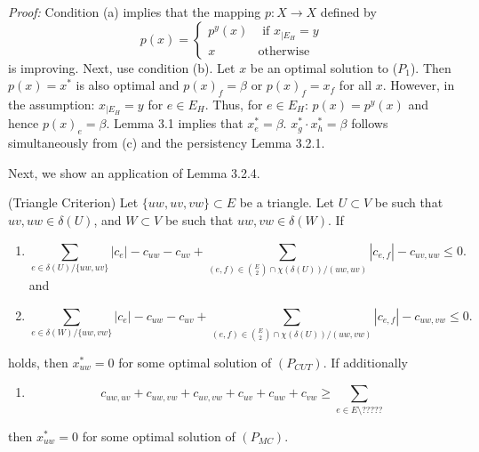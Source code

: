 \textit{Proof:} Condition (a) implies that the mapping $p:X \to X$ defined by 
\[ p(x)= \begin{cases}
    p^y(x) & \text{ if } x_{|E_H} =y \\
    x & \text{otherwise } 
\end{cases} \]
is improving. 
Next, use condition (b). Let $x$ be an optimal solution to ($P_1$). Then $p(x)=x^*$ is also optimal and $p(x)_f= \beta$ or $p(x)_f=x_f$ for all $x$. However, in the assumption: $x_{|E_H} = y$ for $e \in E_H$. Thus, for $e \in E_H$: $p(x)=p^y(x)$ and hence $p(x)_e=\beta$. Lemma 3.1 implies that $x^*_e=\beta$.
$x^*_g \cdot x^*_h = \beta$ follows simultaneously from (c) and the persistency Lemma 3.2.1.  

Next, we show an application of Lemma 3.2.4.
\begin{corollary}{(Triangle Criterion)}
Let $\{uw,uv,vw\} \subset E$ be a triangle. Let $U \subset V$ be such that $uv, uw \in \delta(U)$, and $W \subset V$ be such that $uw,vw \in \delta(W)$. If 
\begin{enumerate}
\item \begin{equation*}
\sum_{e \in \delta(U)/ \{uw, uv \}} |c_e| - c_{uw} -c_{uv} + \sum_{ (e,f) \in {E \choose 2} \cap \chi(\delta(U))  / (uw, uv)} |c_{e,f}|-c_{uv,uw} \leq 0. 
\end{equation*} and
\item \begin{equation*}
\sum_{e \in \delta(W)/ \{uw, vw \}} |c_e| - c_{uw} -c_{uv} + \sum_{ (e,f) \in {\binom{E}{2}} \cap \chi(\delta(U))  / (uw, vw)} |c_{e,f}| - c_{uw,vw} \leq 0. 
\end{equation*} 
\end{enumerate}
holds, then $x^*_{uw}=0$ for some optimal solution of $(P_{CUT})$. If additionally 
\begin{enumerate}[resume]
\item \begin{equation}
c_{uw,uv}+c_{uw,vw}+c_{uv,vw}+c_{uv}+c_{uw}+c_{vw} \geq \sum_{e \in E \setminus ????? } 
\end{equation}
\end{enumerate}
then $x^*_{uw}=0$ for some optimal solution of $(P_{MC})$. 
\end{corollary}

